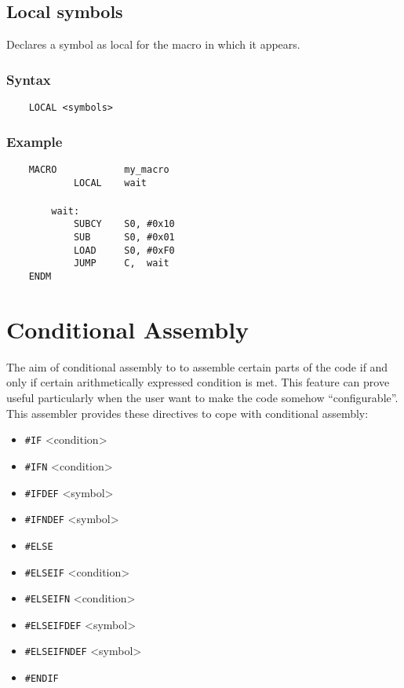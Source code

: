     \subsection{Local symbols}
            Declares a symbol as local for the macro in which it appears.

            \subsubsection{Syntax}
                \verb'    LOCAL <symbols>'

            \subsubsection{Example}
                \verb'    MACRO            my_macro'\\
                \verb'            LOCAL    wait'\\
                \verb''\\
                \verb'        wait:'\\
                \verb'            SUBCY    S0, #0x10'\\
                \verb'            SUB      S0, #0x01' \\
                \verb'            LOAD     S0, #0xF0'\\
                \verb'            JUMP     C,  wait'\\
                \verb'    ENDM'

\clearpage
\section{Conditional Assembly}
    The aim of conditional assembly to to assemble certain parts of the code if and only if certain arithmetically expressed condition is met. This feature can prove useful particularly when the user want to make the code somehow ``configurable''. This assembler provides these directives to cope with conditional assembly:

    \begin{itemize}
        \item \texttt{\#IF}     <condition>
        \item \texttt{\#IFN}    <condition>
        \item \texttt{\#IFDEF}  <symbol>
        \item \texttt{\#IFNDEF} <symbol>
        \item \texttt{\#ELSE}
        \item \texttt{\#ELSEIF}     <condition>
        \item \texttt{\#ELSEIFN}    <condition>
        \item \texttt{\#ELSEIFDEF}  <symbol>
        \item \texttt{\#ELSEIFNDEF} <symbol>
        \item \texttt{\#ENDIF}
    \end{itemize}

